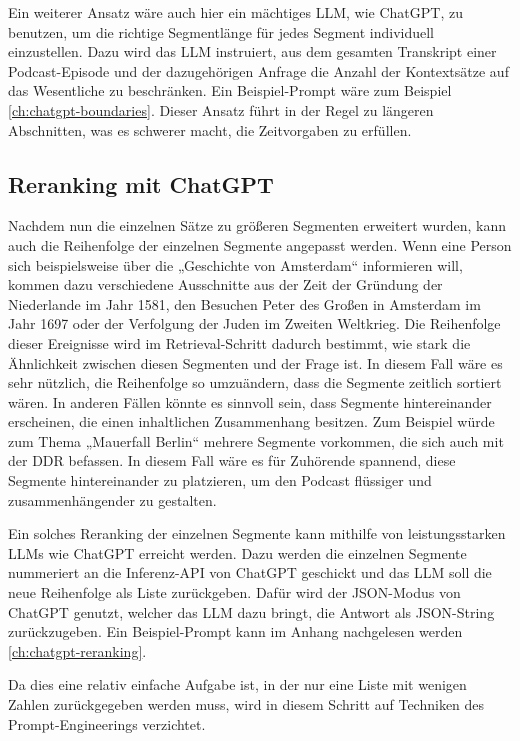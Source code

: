 Ein weiterer Ansatz wäre auch hier ein mächtiges LLM, wie ChatGPT, zu benutzen, um die richtige Segmentlänge für jedes Segment individuell einzustellen.
Dazu wird das LLM instruiert, aus dem gesamten Transkript einer Podcast-Episode und der dazugehörigen Anfrage die Anzahl der Kontextsätze auf das Wesentliche zu beschränken.
Ein Beispiel-Prompt wäre zum Beispiel \autoref{ch:chatgpt-boundaries}.
Dieser Ansatz führt in der Regel zu längeren Abschnitten, was es schwerer macht, die Zeitvorgaben zu erfüllen.

\subsection{Reranking mit ChatGPT}

Nachdem nun die einzelnen Sätze zu größeren Segmenten erweitert wurden, kann auch die Reihenfolge der einzelnen Segmente angepasst werden.
Wenn eine Person sich beispielsweise über die „Geschichte von Amsterdam“ informieren will, kommen dazu verschiedene Ausschnitte aus der Zeit der Gründung der Niederlande im Jahr 1581, den Besuchen Peter des Großen in Amsterdam im Jahr 1697 oder der Verfolgung der Juden im Zweiten Weltkrieg.
Die Reihenfolge dieser Ereignisse wird im Retrieval-Schritt dadurch bestimmt, wie stark die Ähnlichkeit zwischen diesen Segmenten und der Frage ist.
In diesem Fall wäre es sehr nützlich, die Reihenfolge so umzuändern, dass die Segmente zeitlich sortiert wären.
In anderen Fällen könnte es sinnvoll sein, dass Segmente hintereinander erscheinen, die einen inhaltlichen Zusammenhang besitzen.
Zum Beispiel würde zum Thema „Mauerfall Berlin“ mehrere Segmente vorkommen, die sich auch mit der DDR befassen.
In diesem Fall wäre es für Zuhörende spannend, diese Segmente hintereinander zu platzieren, um den Podcast flüssiger und zusammenhängender zu gestalten.

Ein solches Reranking der einzelnen Segmente kann mithilfe von leistungsstarken LLMs wie ChatGPT erreicht werden.
Dazu werden die einzelnen Segmente nummeriert an die Inferenz-API von ChatGPT geschickt und das LLM soll die neue Reihenfolge als Liste zurückgeben.
Dafür wird der JSON-Modus von ChatGPT genutzt, welcher das LLM dazu bringt, die Antwort als JSON-String zurückzugeben.
Ein Beispiel-Prompt kann im Anhang nachgelesen werden \autoref{ch:chatgpt-reranking}.

Da dies eine relativ einfache Aufgabe ist, in der nur eine Liste mit wenigen Zahlen zurückgegeben werden muss, wird in diesem Schritt auf Techniken des Prompt-Engineerings verzichtet.



